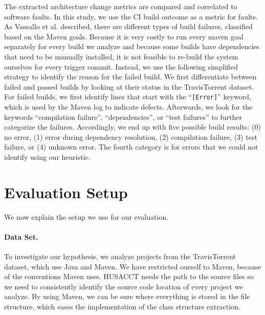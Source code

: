 \documentclass[sigconf, anonymous, review]{acmart}
\begin{document}
The extracted architecture change metrics are compared and correlated to software faults. In this study, we use the CI build outcome as a metric for faults. 
As Vassallo et al. \cite{CIFailTypes} described, there are different types of build failures, classified based on the Maven goals. 
Because it is very costly to run every maven goal separately for every build we analyze and because some builds have dependencies that need to be manually installed, it is not feasible to re-build the system ourselves for every trigger commit.
Instead, we use the following simplified strategy to identify the reason for the failed build.
We first differentiate between failed and passed builds by looking at their status in the TravisTorrent dataset. For failed builds, we first identify lines that start with the ``\texttt{[Error]}'' keyword, which is used by the Maven log to indicate defects. Afterwards, we look for the keywords ``compilation failure'', ``dependencies'', or ``test failures'' to further categorize the failures. Accordingly, we end up with five possible build results: (0) no error, (1) error during dependency resolution, (2) compilation failure, (3) test failure, or (4) unknown error. The fourth category is for errors that we could not identify using our heuristic.

\section{Evaluation Setup}



We now explain the setup we use for our evaluation.

\paragraph{Data Set.}
To investigate our hypothesis, we analyze projects from the TravisTorrent dataset, which use Java and Maven. 
We have restricted ourself to Maven, because of the conventions Maven uses. HUSACCT needs the path to the source files so we need to consistently identify the source code location of every project we analyze. By using Maven, we can be sure where everything is stored in the file structure, which eases the implementation of the class structure extraction.
\end{document}
